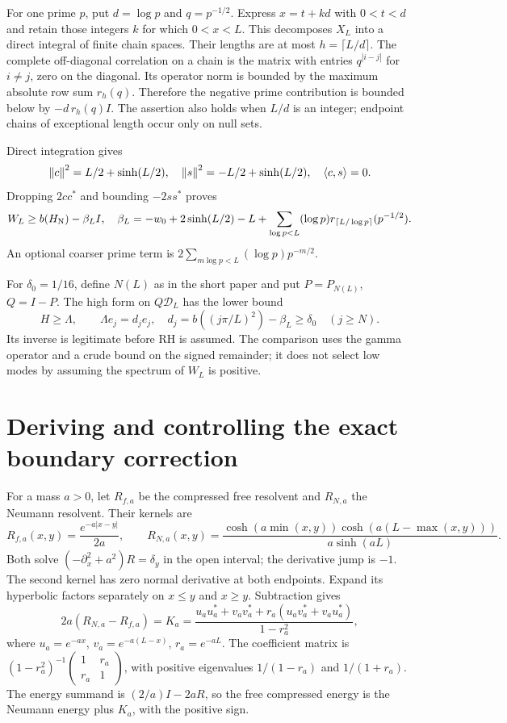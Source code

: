 For one prime $p$, put $d=\log p$ and $q=p^{-1/2}$. Express $x=t+kd$
with $0<t<d$ and retain those integers $k$ for which $0<x<L$.
This decomposes $X_L$ into a direct integral of finite chain spaces.
Their lengths are at most $h=\lceil L/d\rceil$. The complete off-diagonal
correlation on a chain is the matrix with entries
$q^{|i-j|}$ for $i\ne j$, zero on the diagonal. Its operator norm is
bounded by the maximum absolute row sum $r_h(q)$. Therefore the negative
prime contribution is bounded below by $-d\,r_h(q)I$. The assertion also
holds when $L/d$ is an integer; endpoint chains of exceptional length
occur only on null sets.

Direct integration gives
\[
\left\lVert c\right\rVert^2=L/2+\sinh(L/2),\quad
\left\lVert s\right\rVert^2=-L/2+\sinh(L/2),\quad\left\langle c,s\right\rangle=0.
\]
Dropping $2cc^*$ and bounding $-2ss^*$ proves
\begin{equation}\label{d:beta}
W_L\ge b(H_{\rm N})-\beta_LI,
\quad\beta_L=-w_0+2\sinh(L/2)-L+
\sum_{\log p<L}(\log p)r_{\lceil L/\log p\rceil}(p^{-1/2}).
\end{equation}
An optional coarser prime term is
$2\sum_{m\log p<L}(\log p)p^{-m/2}$.

For $\delta_0=1/16$, define $N(L)$ as in the short paper and put
$P=P_{N(L)}$, $Q=I-P$. The high form on $Q\mathcal D_L$ has the lower
bound
\[
H\ge\Lambda,\qquad\Lambda e_j=d_je_j,\quad
d_j=b((j\pi/L)^2)-\beta_L\ge\delta_0\quad(j\ge N).
\]
Its inverse is legitimate before RH is assumed. The comparison uses the
gamma operator and a crude bound on the signed remainder; it does not
select low modes by assuming the spectrum of $W_L$ is positive.

\section{Deriving and controlling the exact boundary correction}
For a mass $a>0$, let $R_{f,a}$ be the compressed free resolvent and
$R_{N,a}$ the Neumann resolvent. Their kernels are
\[
R_{f,a}(x,y)=\frac{e^{-a|x-y|}}{2a},\qquad
R_{N,a}(x,y)=\frac{\cosh(a\min(x,y))\cosh(a(L-\max(x,y)))}{a\sinh(aL)}.
\]
Both solve $(-\partial_x^2+a^2)R=\delta_y$ in the open interval;
the derivative jump is $-1$. The second kernel has zero normal derivative
at both endpoints. Expand its hyperbolic factors separately on $x\le y$
and $x\ge y$. Subtraction gives
\begin{equation}\label{d:mass-boundary}
2a(R_{N,a}-R_{f,a})=K_a
=\frac{u_au_a^*+v_av_a^*+r_a(u_av_a^*+v_au_a^*)}{1-r_a^2},
\end{equation}
where $u_a=e^{-ax}$, $v_a=e^{-a(L-x)}$, $r_a=e^{-aL}$.
The coefficient matrix is $(1-r_a^2)^{-1}
\left(\begin{smallmatrix}1&r_a\\r_a&1\end{smallmatrix}\right)$, with
positive eigenvalues $1/(1-r_a)$ and $1/(1+r_a)$.
The energy summand is $(2/a)I-2aR$, so the free compressed energy is
the Neumann energy plus $K_a$, with the positive sign.

